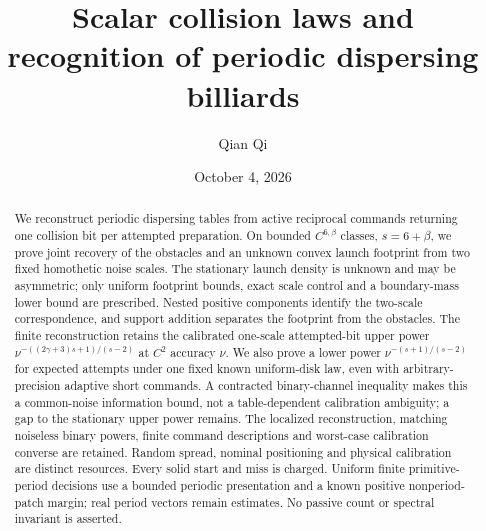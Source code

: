 \documentclass[11pt]{amsart}
\title[Scalar collision laws]{Scalar collision laws and recognition of periodic dispersing billiards}
\author{Qian Qi}
\date{October 4, 2026}
\theoremstyle{definition}\newtheorem{definition}[theorem]{Definition}
\theoremstyle{remark}\newtheorem{remark}[theorem]{Remark}
\numberwithin{equation}{section}
\begin{document}
\raggedbottom
\begin{abstract}
We reconstruct periodic dispersing tables from active reciprocal commands
returning one collision bit per attempted preparation. On bounded
$C^{6,\beta}$ classes, $s=6+\beta$, we prove joint recovery of the
obstacles and an unknown convex launch footprint from two fixed homothetic
noise scales. The stationary launch density is unknown and may be
asymmetric; only uniform footprint bounds, exact scale control and a
boundary-mass lower bound are prescribed. Nested positive components
identify the two-scale correspondence, and support addition separates
the footprint from the obstacles. The finite reconstruction retains the
calibrated one-scale attempted-bit upper power
$\nu^{-((2\gamma+3)s+1)/(s-2)}$ at $C^2$ accuracy $\nu$.
We also prove a lower power $\nu^{-(s+1)/(s-2)}$ for expected attempts
under one fixed known uniform-disk law, even with arbitrary-precision
adaptive short commands. A contracted binary-channel inequality makes
this a common-noise information bound, not a table-dependent calibration
ambiguity; a gap to the stationary upper power remains. The localized
reconstruction, matching noiseless binary powers, finite command
descriptions and worst-case calibration converse are retained. Random
spread, nominal positioning and physical calibration are distinct
resources. Every solid start and miss is charged. Uniform finite
primitive-period decisions use a bounded periodic presentation and a
known positive nonperiod-patch margin; real period vectors remain
estimates. No passive count or spectral invariant is asserted.
\end{abstract}
\maketitle















\end{document}
